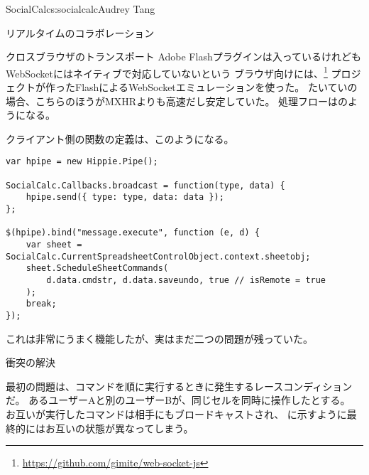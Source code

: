 \begin{aosachapter}{SocialCalc}{s:socialcalc}{Audrey Tang}
\begin{aosasect1}{リアルタイムのコラボレーション}
\begin{aosasect2}{クロスブラウザのトランスポート}
Adobe Flashプラグインは入っているけれどもWebSocketにはネイティブで対応していないという
ブラウザ向けには、\footnote{\url{https://github.com/gimite/web-socket-js}}
プロジェクトが作ったFlashによるWebSocketエミュレーションを使った。
たいていの場合、こちらのほうがMXHRよりも高速だし安定していた。
処理フローはのようになる。


\pagebreak

クライアント側の関数の定義は、このようになる。

\begin{verbatim}
var hpipe = new Hippie.Pipe();

SocialCalc.Callbacks.broadcast = function(type, data) {
    hpipe.send({ type: type, data: data });
};

$(hpipe).bind("message.execute", function (e, d) {
    var sheet = SocialCalc.CurrentSpreadsheetControlObject.context.sheetobj;
    sheet.ScheduleSheetCommands(
        d.data.cmdstr, d.data.saveundo, true // isRemote = true
    );
    break;
});
\end{verbatim}

\noindent
これは非常にうまく機能したが、実はまだ二つの問題が残っていた。

\end{aosasect2}

\begin{aosasect2}{衝突の解決}

最初の問題は、コマンドを順に実行するときに発生するレースコンディションだ。
あるユーザーAと別のユーザーBが、同じセルを同時に操作したとする。
お互いが実行したコマンドは相手にもブロードキャストされ、
に示すように最終的にはお互いの状態が異なってしまう。


\end{aosasect2}
\end{aosasect1}
\end{aosachapter}
